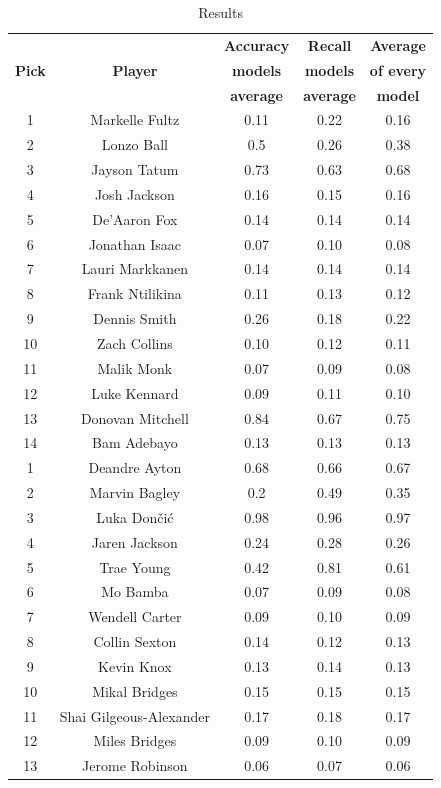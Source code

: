 \documentclass[a4paper]{article}
\begin{document}
\begin{table}[!h] %
\begin{center}
\begin{tabular}{|c|c|c|c|c|} \hline
\textbf{ } & \textbf{ } & \textbf{Accuracy} & \textbf{Recall} & \textbf{Average} \\
\textbf{Pick} & \textbf{Player} & \textbf{models} & \textbf{models} & \textbf{of every} \\
\textbf{ } & \textbf{ } & \textbf{average} & \textbf{average} & \textbf{model} \\ \hline
1 & Markelle Fultz & 0.11 & 0.22 & 0.16 \\ \hline
2 & Lonzo Ball & 0.5 & 0.26 & 0.38 \\ \hline
3 & Jayson Tatum & 0.73 & 0.63 & 0.68 \\ \hline
4 & Josh Jackson & 0.16 & 0.15 & 0.16 \\ \hline
5 & De'Aaron Fox & 0.14 & 0.14 & 0.14 \\ \hline
6 & Jonathan Isaac & 0.07 & 0.10 & 0.08 \\ \hline
7 & Lauri Markkanen & 0.14 & 0.14 & 0.14 \\ \hline
8 & Frank Ntilikina & 0.11 & 0.13 & 0.12 \\ \hline
9 & Dennis Smith & 0.26 & 0.18 & 0.22 \\ \hline
10 & Zach Collins & 0.10 & 0.12 & 0.11 \\ \hline
11 & Malik Monk & 0.07 & 0.09 & 0.08 \\ \hline
12 & Luke Kennard & 0.09 & 0.11 & 0.10 \\ \hline
13 & Donovan Mitchell & 0.84 & 0.67 & 0.75 \\ \hline
14 & Bam Adebayo & 0.13 & 0.13 & 0.13 \\ \hline
1 & Deandre Ayton & 0.68 & 0.66 & 0.67 \\ \hline
2 & Marvin Bagley & 0.2 & 0.49 & 0.35 \\ \hline
3 & Luka Dončić & 0.98 & 0.96 & 0.97 \\ \hline
4 & Jaren Jackson & 0.24 & 0.28 & 0.26 \\ \hline
5 & Trae Young & 0.42 & 0.81 & 0.61 \\ \hline
6 & Mo Bamba & 0.07 & 0.09 & 0.08 \\ \hline
7 & Wendell Carter & 0.09 & 0.10 & 0.09 \\ \hline
8 & Collin Sexton & 0.14 & 0.12 & 0.13 \\ \hline
9 & Kevin Knox & 0.13 & 0.14 & 0.13 \\ \hline
10 & Mikal Bridges & 0.15 & 0.15 & 0.15 \\ \hline
11 & Shai Gilgeous-Alexander & 0.17 & 0.18 & 0.17 \\ \hline
12 & Miles Bridges & 0.09 & 0.10 & 0.09 \\ \hline
13 & Jerome Robinson & 0.06 & 0.07 & 0.06 \\ \hline
\end{tabular}
\caption{Results}
\label{tab:results_all_star}
\end{center}
\end{table}
\end{document}
